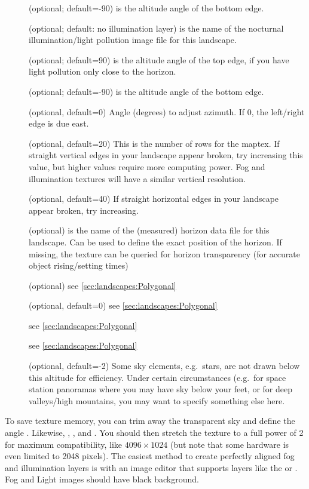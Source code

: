 \begin{description}
\item[] (optional; default=-90) is the
  altitude angle of the bottom edge.
\item[] (optional; default: no illumination layer)
  is the name of the nocturnal illumination/light pollution image file
  for this landscape.
\item[] (optional; default=90) is the altitude
  angle of the top edge, if you have light pollution only close to the
  horizon.
\item[] (optional; default=-90) is the
  altitude angle of the bottom edge.
\item[] (optional, default=0) Angle (degrees) to
  adjust azimuth. If 0, the left/right edge is due east.
\item[] (optional, default=20) This is the number
  of rows for the maptex. If straight vertical edges in your landscape
  appear broken, try increasing this value, but higher values require
  more computing power. Fog and illumination textures will have a
  similar vertical resolution.
\item[] (optional, default=40) If straight
  horizontal edges in your landscape appear broken, try increasing.
\item[] (optional) is the name of the
  (measured) horizon data file for this landscape. Can be used to
  define the exact position of the horizon. If missing, the texture
  can be queried for horizon transparency (for accurate object
  rising/setting times)
\item[] (optional) see \ref{sec:landscapes:Polygonal}
\item[] (optional, default=0) see \ref{sec:landscapes:Polygonal}
\item[] see \ref{sec:landscapes:Polygonal}
\item[]  see \ref{sec:landscapes:Polygonal}
\item[] (optional, default=-2)  Some sky
  elements, e.g.\ stars, are not drawn below this altitude for
  efficiency. Under certain circumstances (e.g.\ for space station
  panoramas where you may have sky below your feet, or for deep
  valleys/high mountains, you may want to specify something else
  here.
\end{description}
%
To save texture memory, %
you can trim away the transparent
sky and define the angle . Likewise,
, ,  and
. You should then stretch the texture to a
full power of 2 for maximum compatibility, like $4096\times1024$ (but note that some hardware is
even limited to 2048 pixels). The easiest method to create perfectly
aligned fog and illumination layers is with an image editor that
supports layers like the  or . Fog
and Light images should have black background.


